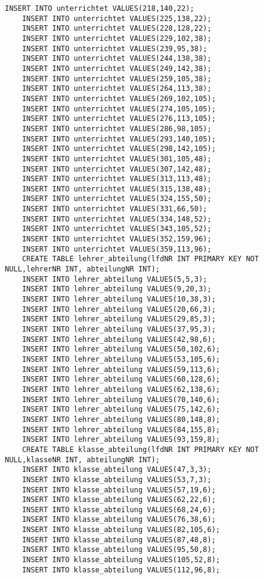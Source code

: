 \begin{lstlisting}[breaklines=True, numbers=none, basicstyle=\tiny, keepspaces=false]
	INSERT INTO unterrichtet VALUES(218,140,22);
	INSERT INTO unterrichtet VALUES(225,138,22);
	INSERT INTO unterrichtet VALUES(228,128,22);
	INSERT INTO unterrichtet VALUES(229,102,38);
	INSERT INTO unterrichtet VALUES(239,95,38);
	INSERT INTO unterrichtet VALUES(244,138,38);
	INSERT INTO unterrichtet VALUES(249,142,38);
	INSERT INTO unterrichtet VALUES(259,105,38);
	INSERT INTO unterrichtet VALUES(264,113,38);
	INSERT INTO unterrichtet VALUES(269,102,105);
	INSERT INTO unterrichtet VALUES(274,105,105);
	INSERT INTO unterrichtet VALUES(276,113,105);
	INSERT INTO unterrichtet VALUES(286,98,105);
	INSERT INTO unterrichtet VALUES(293,140,105);
	INSERT INTO unterrichtet VALUES(298,142,105);
	INSERT INTO unterrichtet VALUES(301,105,48);
	INSERT INTO unterrichtet VALUES(307,142,48);
	INSERT INTO unterrichtet VALUES(313,113,48);
	INSERT INTO unterrichtet VALUES(315,138,48);
	INSERT INTO unterrichtet VALUES(324,155,50);
	INSERT INTO unterrichtet VALUES(331,66,50);
	INSERT INTO unterrichtet VALUES(334,148,52);
	INSERT INTO unterrichtet VALUES(343,105,52);
	INSERT INTO unterrichtet VALUES(352,159,96);
	INSERT INTO unterrichtet VALUES(359,113,96);
	CREATE TABLE lehrer_abteilung(lfdNR INT PRIMARY KEY NOT NULL,lehrerNR INT, abteilungNR INT);
	INSERT INTO lehrer_abteilung VALUES(5,5,3);
	INSERT INTO lehrer_abteilung VALUES(9,20,3);
	INSERT INTO lehrer_abteilung VALUES(10,38,3);
	INSERT INTO lehrer_abteilung VALUES(20,66,3);
	INSERT INTO lehrer_abteilung VALUES(29,85,3);
	INSERT INTO lehrer_abteilung VALUES(37,95,3);
	INSERT INTO lehrer_abteilung VALUES(42,98,6);
	INSERT INTO lehrer_abteilung VALUES(50,102,6);
	INSERT INTO lehrer_abteilung VALUES(53,105,6);
	INSERT INTO lehrer_abteilung VALUES(59,113,6);
	INSERT INTO lehrer_abteilung VALUES(60,128,6);
	INSERT INTO lehrer_abteilung VALUES(62,138,6);
	INSERT INTO lehrer_abteilung VALUES(70,140,6);
	INSERT INTO lehrer_abteilung VALUES(75,142,6);
	INSERT INTO lehrer_abteilung VALUES(80,148,8);
	INSERT INTO lehrer_abteilung VALUES(84,155,8);
	INSERT INTO lehrer_abteilung VALUES(93,159,8);
	CREATE TABLE klasse_abteilung(lfdNR INT PRIMARY KEY NOT NULL,klasseNR INT, abteilungNR INT);
	INSERT INTO klasse_abteilung VALUES(47,3,3);
	INSERT INTO klasse_abteilung VALUES(53,7,3);
	INSERT INTO klasse_abteilung VALUES(57,19,6);
	INSERT INTO klasse_abteilung VALUES(62,22,6);
	INSERT INTO klasse_abteilung VALUES(68,24,6);
	INSERT INTO klasse_abteilung VALUES(76,38,6);
	INSERT INTO klasse_abteilung VALUES(82,105,6);
	INSERT INTO klasse_abteilung VALUES(87,48,8);
	INSERT INTO klasse_abteilung VALUES(95,50,8);
	INSERT INTO klasse_abteilung VALUES(105,52,8);
	INSERT INTO klasse_abteilung VALUES(112,96,8);
\end{lstlisting}
